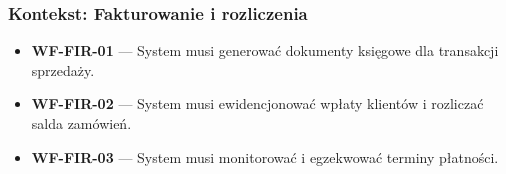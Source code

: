 \subsubsection{Kontekst: Fakturowanie i rozliczenia}
\begin{itemize}
    \item \textbf{WF-FIR-01} --- System musi generować dokumenty księgowe dla transakcji sprzedaży.
    \item \textbf{WF-FIR-02} --- System musi ewidencjonować wpłaty klientów i rozliczać salda zamówień.
    \item \textbf{WF-FIR-03} --- System musi monitorować i egzekwować terminy płatności.
\end{itemize}